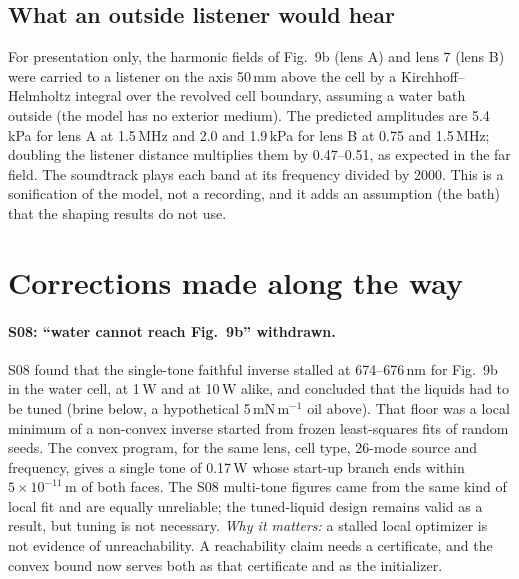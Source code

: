 \documentclass[11pt,a4paper]{article}
\numberwithin{equation}{section}
\begin{document}
\subsection{What an outside listener would hear}\label{sec:sound}

For presentation only, the harmonic fields of Fig.~9b (lens A) and lens 7 (lens
B) were carried to a listener on the axis 50\,mm above the cell by a
Kirchhoff--Helmholtz integral over the revolved cell boundary, assuming a water
bath outside (the model has no exterior medium). The predicted amplitudes are
5.4\,kPa for lens A at 1.5\,MHz and 2.0 and 1.9\,kPa for lens B at 0.75 and
1.5\,MHz; doubling the listener distance multiplies them by 0.47--0.51, as
expected in the far field. The soundtrack plays each band at its frequency
divided by 2000. This is a sonification of the model, not a recording, and it
adds an assumption (the bath) that the shaping results do not use.

\section{Corrections made along the way}\label{sec:corrections}

\paragraph{S08: \enquote{water cannot reach Fig.~9b} withdrawn.} S08 found that
the single-tone faithful inverse stalled at 674--676\,nm for Fig.~9b in the water
cell, at 1\,W and at 10\,W alike, and concluded that the liquids had to be tuned
(brine below, a hypothetical 5\,mN\,m$^{-1}$ oil above). That floor was a local
minimum of a non-convex inverse started from frozen least-squares fits of random
seeds. The convex program, for the same lens, cell type, 26-mode source and
frequency, gives a single tone of 0.17\,W whose start-up branch ends within
$5\times10^{-11}$\,m of both faces. The S08 multi-tone figures came from the same
kind of local fit and are equally unreliable; the tuned-liquid design remains
valid as a result, but tuning is not necessary. \emph{Why it matters:} a stalled
local optimizer is not evidence of unreachability. A reachability claim needs a
certificate, and the convex bound now serves both as that certificate and as the
initializer.
\end{document}
